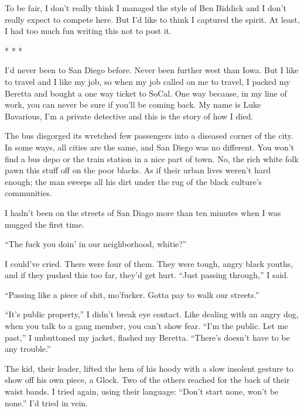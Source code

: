  





To be fair, I don't really think I managed the style of Ben Biddick
and I don't really expect to compete here. But I'd like to think I
captured the spirit. At least, I had too much fun writing this not
to post it.

* * *

I'd never been to San Diego before. Never been further west
than Iowa. But I like to travel and I like my job, so when my job
called on me to travel, I packed my Beretta and bought a one way
ticket to SoCal. One way because, in my line of work, you can never
be sure if you'll be coming back. My name is Luke Bavarious,
I'm a private detective and this is the story of how I died.



The bus disgorged its wretched few passengers into a diseased
corner of the city. In some ways, all cities are the same, and San
Diego was no different. You won't find a bus depo or the
train station in a nice part of town. No, the rich white folk pawn
this stuff off on the poor blacks. As if their urban lives
weren't hard enough; the man sweeps all his dirt under the
rug of the black culture's communities.



I hadn't been on the streets of San Diago more than ten
minutes when I was mugged the first time.



``The fuck you doin' in our neighborhood,
whitie?''



I could've cried. There were four of them. They were tough,
angry black youths, and if they pushed this too far, they'd
get hurt. ``Just passing through,'' I said.



``Passing like a piece of shit, mo'fucker. Gotta pay to
walk our streets.''



``It's public property,'' I didn't break eye
contact. Like dealing with an angry dog, when you talk to a gang
member, you can't show fear. ``I'm the public. Let
me past,'' I unbuttoned my jacket, flashed my Beretta.
``There's doesn't have to be any
trouble.''



The kid, their leader, lifted the hem of his hoody with a slow
insolent gesture to show off his own piece, a Glock. Two of the
others reached for the back of their waist bands. I tried again,
using their language: ``Don't start none, won't be
none.'' I'd tried in vein.



